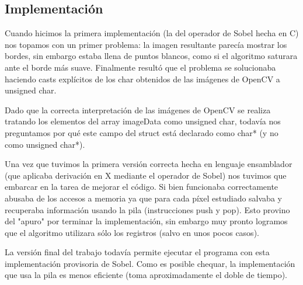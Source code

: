 \subsection{Implementación}

Cuando hicimos la primera implementación (la del operador de Sobel hecha en C) nos topamos con un primer problema: la imagen resultante parecía mostrar los bordes, sin embargo estaba llena de puntos blancos, como si el algoritmo saturara ante el borde más suave. Finalmente resultó que el problema se solucionaba haciendo casts explícitos de los char obtenidos de las imágenes de OpenCV a unsigned char.

Dado que la correcta interpretación de las imágenes de OpenCV se realiza tratando los elementos del array imageData como unsigned char, todavía nos preguntamos por qué este campo del struct está declarado como char* (y no como unsigned char*).

%
%

Una vez que tuvimos la primera versión correcta hecha en lenguaje ensamblador (que aplicaba derivación en X mediante el operador de Sobel) nos tuvimos que embarcar en la tarea de mejorar el código. Si bien funcionaba correctamente abusaba de los accesos a memoria ya que para cada píxel estudiado salvaba y recuperaba información usando la pila (instrucciones push y pop). Esto provino del "apuro" por terminar la implementación, sin embargo muy pronto logramos que el algoritmo utilizara sólo los registros (salvo en unos pocos casos).

La versión final del trabajo todavía permite ejecutar el programa con esta implementación provisoria de Sobel. Como es posible chequar, la implementación que usa la pila es menos eficiente (toma aproximadamente el doble de tiempo).
